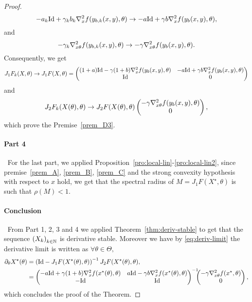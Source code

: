 \begin{appendices}
\begin{proof}
\[
-a_{k}\mathrm{Id}+\gamma_{k}b_{k}\nabla_x^2f(y_{b,k}(x,y),\theta)\to -a\mathrm{Id}+\gamma b\nabla_x^2f(y_b(x,y),\theta),
\]
and 
\[
-\gamma_{k}\nabla_{x\theta}^2f(y_{b,k}(x,y),\theta)\to-\gamma\nabla_{x\theta}^2f(y_b(x,y),\theta).
\]
Consequently, we get  
\[
J_1F_k(X,\theta)\to J_1F(X,\theta)= \begin{pmatrix} (1+a)\mathrm{Id}-\gamma(1+b)\nabla_x^2f(y_b(x,y),\theta) &-a\mathrm{Id}+\gamma b\nabla_x^2f(y_b(x,y),\theta)\\ \mathrm{Id}  & 
		0\end{pmatrix}
\]
and 
\[
J_2F_k(X(\theta),\theta)\to J_2F(X(\theta),\theta)  \begin{pmatrix} -\gamma\nabla_{x\theta}^2f(y_b(x,y),\theta)  \\  
		0\end{pmatrix},
\]
 which prove the Premise~\ref{prem_D3}. 
 
 \paragraph{Part 4}\label{thm:gim-stable-part4}$~$
For the last part, we applied Proposition~\ref{pro:local-lin}-\ref{pro:local-lin2}, since premise~\ref{prem_A}, \ref{prem_B}, \ref{prem_C} and the strong convexity hypothesis with respect to $x$ hold, we get that  the spectral radius of $M=J_1F(X^{\star},\theta)$ is such that $\rho(M)<1.$
 
 \paragraph{Conclusion} $~$
 From Part 1, 2, 3 and 4 we applied  Theorem~\ref{thm:deriv-stable} to get that the sequence $\left(X_k\right)_{k\in\mathbb{N}}$ is derivative stable. Moreover we have  by \eqref{eq:deriv-limit}  the derivative limit is written as $\forall\theta\in\Theta,$
 \begin{align*}
 \partial_{\theta}X^{\star}\pa{\theta}&=\Ppa{\Id-J_1F(X^{\star}\pa{\theta},\theta)}^{-1}J_2F(X^{\star}\pa{\theta},\theta),\\ 
 &=\begin{pmatrix} -a\Id+\gamma(1+b)\nabla_x^2f(\xsol(\theta),\theta) &a\Id-\gamma b\nabla_x^2f(\xsol\pa{\theta},\theta) \\ -\Id  & 
		\Id\end{pmatrix}^{-1}\hspace{-0.2cm}\begin{pmatrix} -\gamma\nabla_{x\theta}^2f(\xsol,\theta)  \\  
		0\end{pmatrix},
 \end{align*}
 which concludes the proof of the Theorem.
\end{proof}


\end{appendices}
